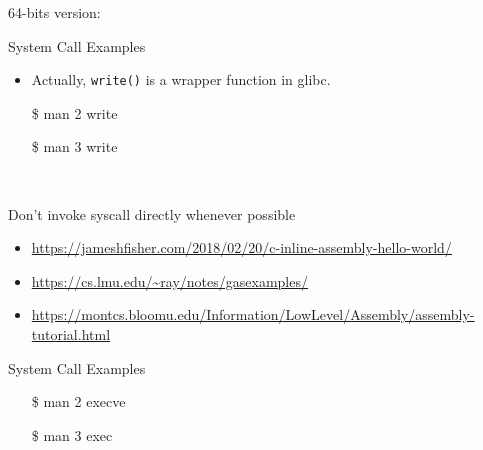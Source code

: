 64-bits version:

\begin{frame}{System Call Examples}
  \begin{minipage}{.55\linewidth}
  \end{minipage}\quad
  \begin{minipage}{.4\linewidth}\ttfamily\footnotesize
    \begin{itemize}
    \item Actually, \texttt{write()} is a wrapper function in glibc.
    \item[\$] man 2 write
    \item[\$] man 3 write
    \end{itemize}
  \end{minipage}\\[1em]
  \begin{description}
  \item[Don't invoke syscall directly whenever possible]
  \end{description}
\end{frame}

\begin{itemize}
\item \url{https://jameshfisher.com/2018/02/20/c-inline-assembly-hello-world/}
\item \url{https://cs.lmu.edu/~ray/notes/gasexamples/}
\item \url{https://montcs.bloomu.edu/Information/LowLevel/Assembly/assembly-tutorial.html}
\end{itemize}

\begin{frame}{System Call Examples}
  \begin{iblock}{}
    \begin{center}
    \end{center}
  \end{iblock}
\end{frame}

\begin{frame}
  \begin{iblock}{}
    \begin{center}
    \end{center}
  \end{iblock}\ttfamily
  \begin{itemize}
  \item[\$] man 2 execve
  \item[\$] man 3 exec
  \end{itemize}
\end{frame}


